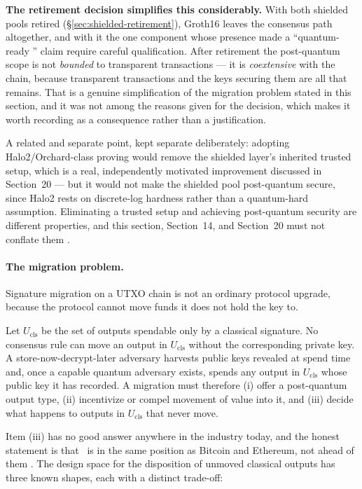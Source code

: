\textbf{The retirement decision simplifies this considerably.} With both shielded pools retired
(\S\ref{sec:shielded-retirement}), Groth16 leaves the consensus path altogether, and with it the one
component whose presence made a ``quantum-ready \Flux'' claim require careful qualification. After
retirement the post-quantum scope is not \emph{bounded} to transparent transactions --- it is
\emph{coextensive} with the chain, because transparent transactions and the keys securing them are
all that remains. That is a genuine simplification of the migration problem stated in this section,
and it was not among the reasons given for the decision, which makes it worth recording as a
consequence rather than a justification.

A related and separate point, kept separate deliberately: adopting Halo2/Orchard-class proving would
remove the shielded layer's inherited trusted setup, which is a real, independently motivated
improvement discussed in Section~20 --- but it would not make the shielded pool post-quantum secure,
since Halo2 rests on discrete-log hardness rather than a quantum-hard assumption. Eliminating a trusted
setup and achieving post-quantum security are different properties, and this section, Section~14, and
Section~20 must not conflate them .

\paragraph{The migration problem.} Signature migration on a UTXO chain is not an ordinary protocol
upgrade, because the protocol cannot move funds it does not hold the key to.

\begin{openproblem}
Let $U_{\mathrm{cls}}$ be the set of outputs spendable only by a classical signature. No consensus rule
can move an output in $U_{\mathrm{cls}}$ without the corresponding private key. A store-now-decrypt-later
adversary harvests public keys revealed at spend time and, once a capable quantum adversary exists,
spends any output in $U_{\mathrm{cls}}$ whose public key it has recorded. A migration must therefore
(i) offer a post-quantum output type, (ii) incentivize or compel movement of value into it, and
(iii) decide what happens to outputs in $U_{\mathrm{cls}}$ that never move.
\end{openproblem}

Item (iii) has no good answer anywhere in the industry today, and the honest statement is that \Flux\
is in the same position as Bitcoin and Ethereum, not ahead of them .
The design space for the disposition of unmoved classical outputs has three known shapes, each with a
distinct trade-off:

